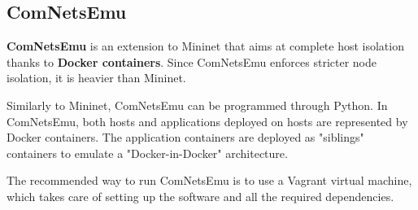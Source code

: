 \subsection{ComNetsEmu}
\label{sec:bg/network/comnetsemu}

\textbf{ComNetsEmu} is an extension to Mininet that aims at complete host isolation thanks to \textbf{Docker containers}. Since ComNetsEmu enforces stricter node isolation, it is heavier than Mininet.

Similarly to Mininet, ComNetsEmu can be programmed through Python. In ComNetsEmu, both hosts and applications deployed on hosts are represented by Docker containers. The application containers are deployed as "siblings" containers to emulate a "Docker-in-Docker" architecture.

The recommended way to run ComNetsEmu is to use a Vagrant virtual machine, which takes care of setting up the software and all the required dependencies.\cite{comnetsemu}

